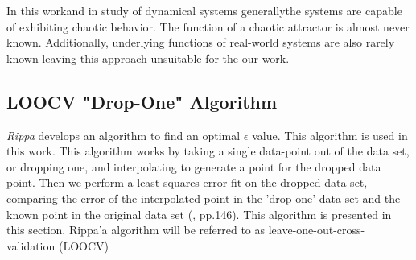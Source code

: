                 In this work\texttwelveudash and in study of dynamical systems generally\texttwelveudash the systems
                are capable of exhibiting chaotic behavior. The function of a chaotic attractor is almost
                never known. Additionally, underlying functions of real-world systems are also rarely known leaving this
                approach unsuitable for the our work.\\

        \subsection{LOOCV "Drop-One" Algorithm}

                \textit{Rippa} \cite{item:3} develops an algorithm to find an optimal $\epsilon$ value. This algorithm is used in this
                work. This algorithm works by taking a single data-point out of the data set, or dropping one, and interpolating
                to generate a point for the dropped data point. Then we perform
                a least-squares error fit on the dropped data set, comparing the error of the interpolated point in the
                'drop one' data set and the known point in the original data set (\cite{item:1}, pp.146). This algorithm is
                presented in this section. Rippa'a algorithm will be referred to as leave-one-out-cross-validation (LOOCV)\\

